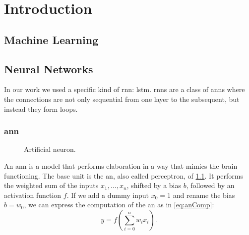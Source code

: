 \chapter{Introduction}
\label{ch:introduction}

\section{Machine Learning}

\section{Neural Networks}
In our work we used a specific kind of \ac{rnn}: \ac{lstm}.
\acp{rnn} are a class of \acp{ann} where the connections are not only
sequential from one layer to the subsequent, but instead they form
loops. 

\subsection{\acf{ann}}
\begin{figure}
  \centering
  \caption{Artificial neuron.}
  \label{fig:neuron}
\end{figure}
An \ac{ann} is a model that performs elaboration in a way that
mimics the brain functioning. The base unit is the \ac{an}, also called
perceptron, of
\cref{fig:neuron}. It performs the weighted sum of the inputs
$x_1,\dots,x_n$, shifted by a bias $b$, followed by an activation
function $f$. If we add a dummy input $x_0=1$ and rename the bias
$b=w_0$, we can express the computation of the \ac{an} as in
\cref{eq:anComp}:
\begin{equation}\label{eq:anComp}
  y = f(\sum_{i=0}^n w_i x_i).
\end{equation}

